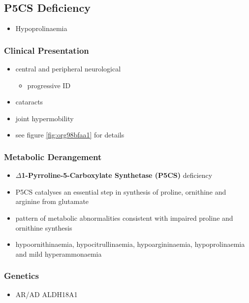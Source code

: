 \documentclass[12pt]{scrartcl}
\begin{document}
\begin{center}
\begin{center}
\subsection{P5CS  Deficiency}
\label{sec:orgabeeb62}
\begin{itemize}
\item Hypoprolinaemia
\end{itemize}
\subsubsection{Clinical Presentation}
\label{sec:org9d42a1c}
\begin{itemize}
\item central and peripheral neurological
\begin{itemize}
\item progressive ID
\end{itemize}
\item cataracts
\item joint hypermobility
\item see figure \ref{fig:org98bfaa1} for details
\end{itemize}

\subsubsection{Metabolic Derangement}
\label{sec:orge0bb36e}
\begin{itemize}
\item \textbf{\(\Delta\)1-Pyrroline-5-Carboxylate Synthetase (P5CS)} deficiency
\item P5CS catalyses an essential step in synthesis of proline, ornithine
and arginine from glutamate
\end{itemize}


\begin{itemize}
\item pattern of metabolic abnormalities consistent with impaired proline
and ornithine synthesis
\item hypoornithinaemia, hypocitrullinaemia, hypoargininaemia,
hypoprolinaemia and mild hyperammonaemia
\end{itemize}

\subsubsection{Genetics}
\label{sec:org95a74e7}
\begin{itemize}
\item AR/AD ALDH18A1
\end{itemize}


\end{center}
\end{center}
\end{document}
